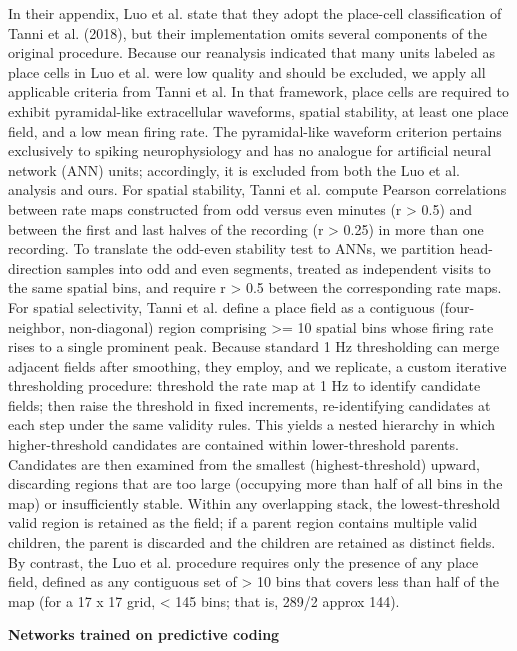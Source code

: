 \documentclass[11pt]{article}
\begin{document}
In their appendix, Luo et al. state that they adopt the place-cell classification of Tanni et al. (2018), but their implementation omits several components of the original procedure. Because our reanalysis indicated that many units labeled as place cells in Luo et al. were low quality and should be excluded, we apply all applicable criteria from Tanni et al. In that framework, place cells are required to exhibit pyramidal-like extracellular waveforms, spatial stability, at least one place field, and a low mean firing rate. The pyramidal-like waveform criterion pertains exclusively to spiking neurophysiology and has no analogue for artificial neural network (ANN) units; accordingly, it is excluded from both the Luo et al. analysis and ours. For spatial stability, Tanni et al. compute Pearson correlations between rate maps constructed from odd versus even minutes (r > 0.5) and between the first and last halves of the recording (r > 0.25) in more than one recording. To translate the odd-even stability test to ANNs, we partition head-direction samples into odd and even segments, treated as independent visits to the same spatial bins, and require r > 0.5 between the corresponding rate maps. For spatial selectivity, Tanni et al. define a place field as a contiguous (four-neighbor, non-diagonal) region comprising >= 10 spatial bins whose firing rate rises to a single prominent peak. Because standard 1 Hz thresholding can merge adjacent fields after smoothing, they employ, and we replicate, a custom iterative thresholding procedure: threshold the rate map at 1 Hz to identify candidate fields; then raise the threshold in fixed increments, re-identifying candidates at each step under the same validity rules. This yields a nested hierarchy in which higher-threshold candidates are contained within lower-threshold parents. Candidates are then examined from the smallest (highest-threshold) upward, discarding regions that are too large (occupying more than half of all bins in the map) or insufficiently stable. Within any overlapping stack, the lowest-threshold valid region is retained as the field; if a parent region contains multiple valid children, the parent is discarded and the children are retained as distinct fields. By contrast, the Luo et al. procedure requires only the presence of any place field, defined as any contiguous set of > 10 bins that covers less than half of the map (for a 17 x 17 grid, < 145 bins; that is, 289/2 approx 144).


{\bf Networks trained on predictive coding}
\end{document}
